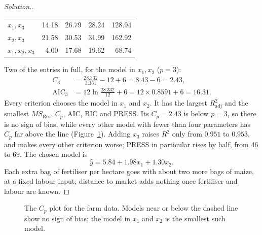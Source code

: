 \documentclass[11pt,a4paper]{article}
\numberwithin{equation}{section}
\theoremstyle{definition}
\newenvironment{solution}
  {\renewcommand{\qedsymbol}{}\begin{proof}[\textit{Solution}.]}
  {\end{proof}}
\begin{document}
\begin{solution}
\begin{center}
\begin{tabular}{l|rrrr}
$x_1, x_3$ & 14.18 & 26.79 & 28.24 & 128.94 \\
$x_2, x_3$ & 21.58 & 30.53 & 31.99 & 162.92 \\
$x_1, x_2, x_3$ & 4.00 & 17.68 & 19.62 & 68.74 \\
\end{tabular}
\end{center}
Two of the entries in full, for the model in $x_1, x_2$ ($p = 3$):
\begin{align*}
C_3 &= \frac{28.332}{3.361} - 12 + 6 = 8.43 - 6 = 2.43 , \\
\mathrm{AIC}_3 &= 12\ln\frac{28.332}{12} + 6 = 12 \times 0.8591 + 6 = 16.31 .
\end{align*}
Every criterion chooses the model in $x_1$ and $x_2$. It has the largest $R^2_{\mathrm{adj}}$ and the
smallest $MS_{\mathrm{Res}}$, $C_p$, AIC, BIC and PRESS. Its $C_p = 2.43$ is below $p = 3$, so there is no
sign of bias, while every other model with fewer than four parameters has $C_p$ far above the line
(Figure~\ref{fig:cp}). Adding $x_3$ raises $R^2$ only from $0.951$ to $0.953$, and makes every other
criterion worse; PRESS in particular rises by half, from $46$ to $69$. The chosen model is
\[
\hat y = 5.84 + 1.98x_1 + 1.30x_2 .
\]
Each extra bag of fertiliser per hectare goes with about two more bags of maize, at a fixed labour
input; distance to market adds nothing once fertiliser and labour are known.
\end{solution}

\begin{figure}[H]
\centering
{}
\caption{The $C_p$ plot for the farm data. Models near or below the dashed line show no sign of
bias; the model in $x_1$ and $x_2$ is the smallest such model.}
\label{fig:cp}
\end{figure}
\end{document}
